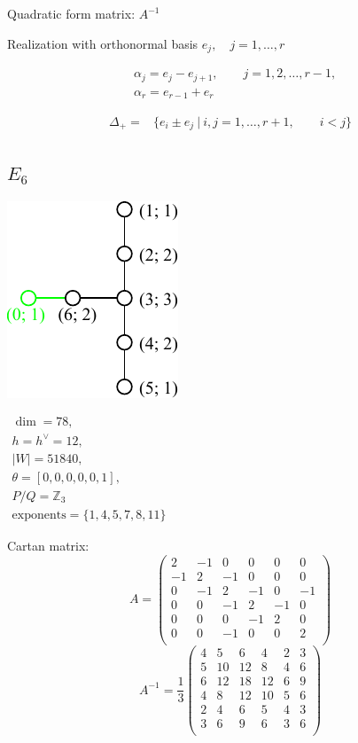 \documentclass[12pt]{article}
\newcommand{\Zb}{\mathbb{Z}}
\newcommand{\hc}{h^{\vee}}
\begin{document}
Quadratic form matrix: $A^{-1}$

Realization with orthonormal basis $e_j,\quad j=1,\dots,r$

\begin{align*}
  &\alpha_{j}=e_j-e_{j+1},\qquad j=1,2,\dots,r-1,\\
  &\alpha_{r}=e_{r-1}+e_{r}
\end{align*}

\begin{align*}
 \Delta_{+}=&\{e_i \pm e_j\ |\ i,j=1,\dots,r+1,\qquad i<j\}
\end{align*}
\newpage
%
\subsection*{$E_6$}
\parbox{8cm}{\includegraphics{lie_E6.pdf}}
$
\begin{array}{l}
 \dim = 78, \\
  h=\hc= 12,\\
 |W|= 51840,\\
 \theta=[0,0,0,0,0,1],\\
 P/Q=\Zb_3 \\
 \text{exponents}={\{1,4,5,7,8,11\}}
\end{array}
$

Cartan matrix:
\[
A=\left(
\begin{array}{cccccc}
 2 &-1& 0& 0& 0&0   \\
 -1& 2&-1& 0& 0& 0 \\
 0 &-1& 2&-1& 0& -1 \\
 0 &0 &-1& 2&-1&  0\\
 0 &0 &0 &-1& 2&  0 \\
 0 &0 &-1 & 0& 0& 2\\
\end{array}
\right)\]
\[
A^{-1}=
\frac{1}{3}\left(
\begin{array}{cccccc}
  4& 5& 6& 4& 2& 3 \\
  5&10&12& 8& 4& 6 \\
  6&12&18&12& 6& 9 \\
  4& 8&12&10& 5& 6 \\
  2& 4& 6& 5& 4& 3 \\
  3& 6& 9& 6& 3& 6 \\
\end{array}
\right)
\]
\end{document}
